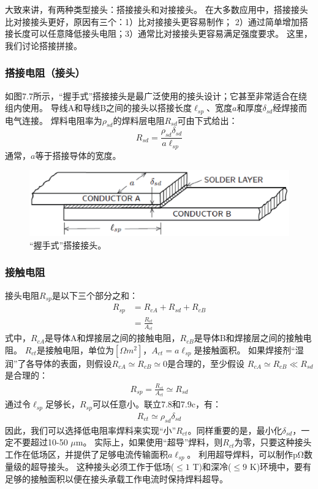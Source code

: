 大致来讲，有两种类型接头：搭接接头和对接接头。
在大多数应用中，搭接接头比对接接头更好，原因有三个：1）比对接接头更容易制作；
2）通过简单增加搭接长度可以任意降低接头电阻；3）通常比对接接头更容易满足强度要求。
这里，我们讨论搭接拼接。

\subsubsection*{搭接电阻（接头）}
如图7.7所示，“握手式”搭接接头是最广泛使用的接头设计；它甚至非常适合在绕组内使用。
导线A和导线B之间的接头以搭接长度$\ell_{sp}$、宽度$a$和厚度$\delta_{sd}$经焊接而电气连接。
焊料电阻率为$\rho_{sd}$的焊料层电阻$R_{sd}$可由下式给出：
\begin{equation}%
R_{sd}=\frac{\rho_{sd}\delta_{sd}}{a\ell_{sp}}
\end{equation}
通常，$a$等于搭接导体的宽度。
\begin{figure}[htbp]
	\centering
	\includegraphics[scale=0.6]{chpt7/figs/fig7.7.eps}
	\caption{“握手式”搭接接头。}
\end{figure}

\subsubsection*{接触电阻}
接头电阻$R_{sp}$是以下三个部分之和：
\begin{subequations}
	\begin{align}
R_{sp}&=R_{cA}+R_{sd}+R_{cB} \\
&=\frac{R_{ct}}{A_{ct}}
	\end{align}
\end{subequations}
式中，$R_{cA}$是导体A和焊接层之间的接触电阻，$R_{cB}$是导体B和焊接层之间的接触电阻。
$R_{ct}$是接触电阻，单位为$[\Omega m^2]$，$A_{ct}=a\ell_{sp}$是接触面积。
如果焊接剂“湿润”了各导体的表面，则假设$R_{cA}\simeq R_{cB}\simeq 0$是合理的，至少假设
$R_{cA}\simeq R_{cB}\ll R_{sd}$是合理的：
\begin{align*}%
R_{sp}=\frac{R_{ct}}{A_{ct}}\simeq R_{sd} \tag{7.9c}
\end{align*}
通过令$\ell_{sp}$足够长，$R_{sp}$可以任意小。联立7.8和7.9c，有：
\begin{align}%
R_{ct}\simeq\rho_{sd}\delta_{sd}
\end{align}
因此，我们可以选择低电阻率焊料来实现“小”$R_{ct}$。同样重要的是，最小化$\delta_{sd}$，一定不要超过10-50 $\mu$m。
实际上，如果使用“超导”焊料，则$R_{ct}$为零，只要这种接头工作在低场区，并提供了足够电流传输面积$a\ell_{sp}$。
利用超导焊料，可以制作$\mathrm{p\Omega}$数量级的超导接头。
这种接头必须工作于低场($\le 1$ T)和深冷($\le 9$ K)环境中，要有足够的接触面积以便在接头承载工作电流时保持焊料超导。

